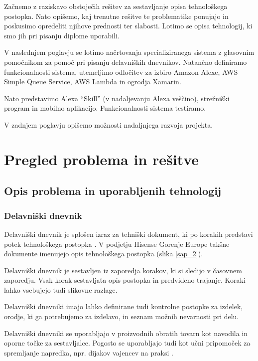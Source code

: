 \documentclass[a4paper, 12pt]{book}
\begin{document}
Začnemo z raziskavo obstoječih rešitev za sestavljanje opisa tehnološkega postopka.
Nato opišemo, kaj trenutne rešitve te problematike ponujajo in poskusimo opredeliti njihove prednosti ter slabosti.
Lotimo se opisa tehnologij, ki smo jih pri pisanju diplome uporabili.

V naslednjem poglavju se lotimo načrtovanja specializiranega sistema z glasovnim pomočnikom za pomoč pri pisanju delavniških dnevnikov.
Natančno definiramo funkcionalnosti sistema, utemeljimo odločitev za izbiro Amazon Alexe, AWS Simple Queue Service, AWS Lambda in ogrodja Xamarin.

Nato predstavimo Alexa \enquote{Skill} (v nadaljevanju Alexa veščino), strežniški program in mobilno aplikacijo.
Funkcionalnosti sistema testiramo.

V zadnjem poglavju opišemo možnosti nadaljnjega razvoja projekta.

\chapter{Pregled problema in rešitve}

\section{Opis problema in uporabljenih tehnologij}

\subsection {Delavniški dnevnik}

Delavniški dnevnik je splošen izraz za tehniški dokument, ki po korakih predstavi potek tehnološkega postopka \cite{delavniskidnevnikptuj}.
V podjetju Hisense Gorenje Europe takšne dokumente imenujejo opis tehnološkega postopka (slika \ref{sap_2}).

Delavniški dnevnik je sestavljen iz zaporedja korakov, ki si sledijo v časovnem zaporedju.
Vsak korak sestavljata opis postopka in predvideno trajanje.
Koraki lahko vsebujejo tudi slikovne razlage.

Delavniški dnevniki imajo lahko definirane tudi kontrolne postopke za izdelek, orodje, ki ga potrebujemo za izdelavo, in seznam možnih nevarnosti pri delu.

Delavniški dnevniki se uporabljajo v proizvodnih obratih tovarn kot navodila in oporne točke za sestavljalce.
Pogosto se uporabljajo tudi kot učni pripomoček za spremljanje napredka, npr. dijakov vajencev na praksi \cite{delavniskidnevnikptuj, ddsclj}.
\end{document}
